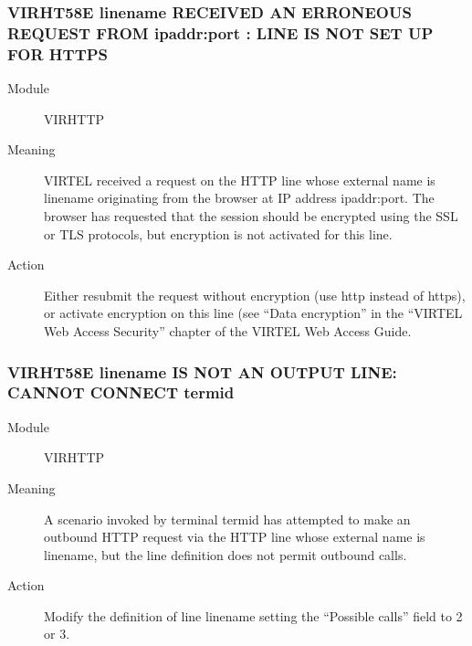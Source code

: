 \documentclass[letterpaper,10pt,english]{sphinxmanual}
\begin{document}
\subsubsection{VIRHT58E linename RECEIVED AN ERRONEOUS REQUEST FROM ipaddr:port : LINE IS NOT SET UP FOR HTTPS}
\label{\detokenize{messages:virht58e-linename-received-an-erroneous-request-from-ipaddr-port-line-is-not-set-up-for-https}}\begin{description}
\item[{Module}] \leavevmode
VIRHTTP

\item[{Meaning}] \leavevmode
VIRTEL received a request on the HTTP line whose external name is linename originating from the browser at IP address ipaddr:port. The browser has requested that the session should be encrypted using the SSL or TLS protocols, but encryption is not activated for this line.

\item[{Action}] \leavevmode
Either resubmit the request without encryption (use http instead of https), or activate encryption on this line (see “Data encryption” in the “VIRTEL Web Access Security” chapter of the VIRTEL Web Access Guide.

\end{description}


\subsubsection{VIRHT58E linename IS NOT AN OUTPUT LINE: CANNOT CONNECT termid}
\label{\detokenize{messages:virht58e-linename-is-not-an-output-line-cannot-connect-termid}}\begin{description}
\item[{Module}] \leavevmode
VIRHTTP

\item[{Meaning}] \leavevmode
A scenario invoked by terminal termid has attempted to make an outbound HTTP request via the HTTP line whose external name is linename, but the line definition does not permit outbound calls.

\item[{Action}] \leavevmode
Modify the definition of line linename setting the “Possible calls” field to 2 or 3.

\end{description}
\end{document}
